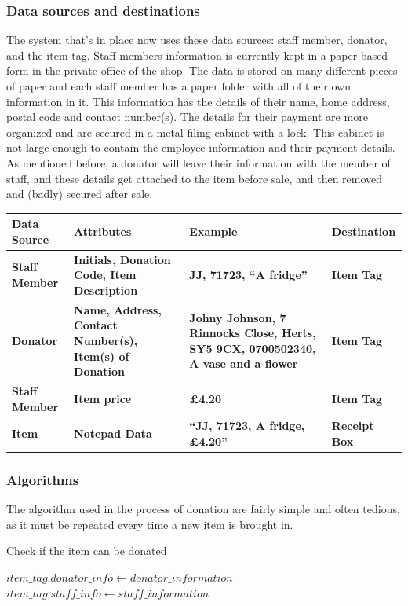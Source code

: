 \subsubsection{Data sources and destinations}
The system that’s in place now uses these data sources: staff member, donator, and the item tag.
 Staff members information is currently kept in a paper based form in the private office of the shop. The data is stored on many different pieces of paper and each staff member has a paper folder with all of their own information in it. This information has the details of their name, home address, postal code and contact number(s). The details for their payment are more organized and are secured in a metal filing cabinet with a lock. This cabinet is not large enough to contain the employee information and their payment details. As mentioned before, a donator will leave their information with the member of staff, and these details get attached to the item before sale, and then removed and (badly) secured after sale.

\begin{tabular}{|p{3cm}|p{4cm}|p{4cm}|p{2cm}|}
	\hline
	\textbf{Data Source} & \textbf{Attributes} & \textbf{Example} & \textbf{Destination}\\ \hline 
	\textbf{Staff Member} & \textbf{Initials, Donation Code, Item Description} & \textbf{JJ, 71723, “A fridge”} & \textbf{Item Tag}\\ \hline
	\textbf{Donator} & \textbf{Name, Address, Contact Number(s), Item(s) of Donation} & \textbf{Johny Johnson, 7 Rinnocks Close, Herts, SY5 9CX, 0700502340, A vase and a flower} & \textbf{Item Tag} \\ \hline
	\textbf{Staff Member} & \textbf{Item price} & \textbf{£4.20} & \textbf{Item Tag} \\ \hline
	\textbf{Item} & \textbf{Notepad Data} & \textbf{“JJ, 71723, A fridge, £4.20”} & \textbf{Receipt Box} \\ \hline
\end{tabular}

\subsubsection{Algorithms}
The algorithm used in the process  of donation are fairly simple and often tedious, as it must be repeated every time a new item is brought in.

\begin{algorithm}[H]
    \caption{Check if the item can be donated}
\begin{algorithmic}[1]
\EndFunction
\Else
\State $item\_tag.donator\_info \gets  donator\_information$
\State $item\_tag.staff\_info \gets  staff\_information$
\EndIf
\end{algorithmic}
\end{algorithm}

